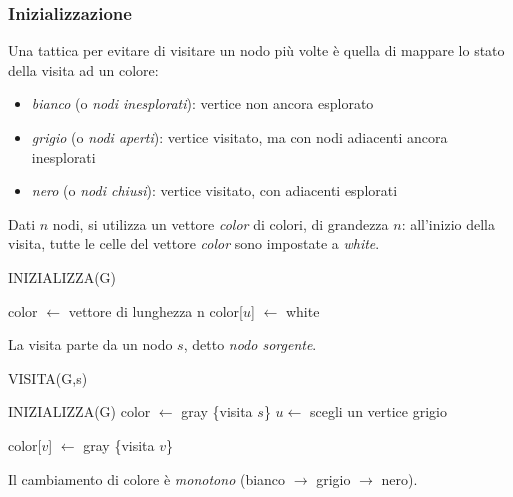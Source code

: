 \documentclass[11pt]{book}
\begin{document}
\subsubsection{Inizializzazione}
Una tattica per evitare di visitare un nodo più volte è quella di mappare lo stato della visita ad un colore:
\begin{itemize}
    \item \textit{bianco} (o \textit{nodi inesplorati}): vertice non ancora esplorato
    \item \textit{grigio} (o \textit{nodi aperti}): vertice visitato, ma con nodi adiacenti ancora inesplorati
    \item \textit{nero} (o \textit{nodi chiusi}): vertice visitato, con adiacenti esplorati
\end{itemize}
Dati $n$ nodi, si utilizza un vettore \textit{color} di colori, di grandezza $n$: all'inizio della visita, tutte le celle 
del vettore \textit{color} sono impostate a \textit{white}.
\begin{algorithm}[H]
    \caption{INIZIALIZZA(G)}
    \begin{algorithmic}
        \State color $\gets$ vettore di lunghezza n
            \State color[$u$] $\gets$ white
        \EndFor
    \end{algorithmic}
\end{algorithm}
La visita parte da un nodo $s$, detto \textit{nodo sorgente}.
\begin{algorithm}[H]
    \caption{VISITA(G,s)}
    \begin{algorithmic}
        \State INIZIALIZZA(G)
        \State color $\gets$ gray
        \State \{visita $s$\}
            \State $u \gets$ scegli un vertice grigio
    \end{algorithmic}
\end{algorithm}
\begin{algorithm}[H]
    \begin{algorithmic}
                \State color[$v$] $\gets$ gray
                \State \{visita $v$\}
            \EndIf
        \EndWhile
    \end{algorithmic}
\end{algorithm}
Il cambiamento di colore è \textit{monotono} (bianco $\rightarrow$ grigio $\rightarrow$ nero).
\end{document}
